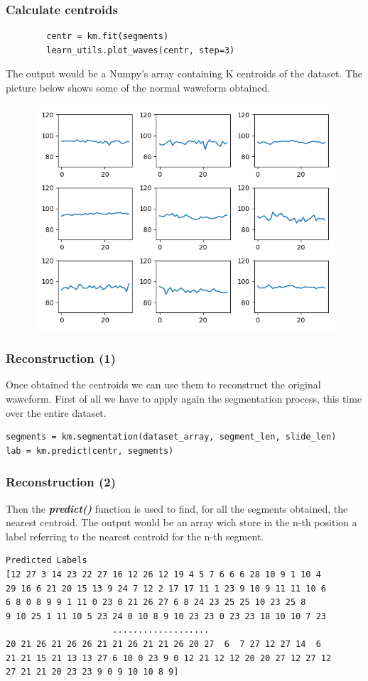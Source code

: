 \documentclass[xcolor ={table,usenames,dvipsnames}]{beamer}
\theoremstyle{definition}
\begin{document}
	\begin{frame}[fragile]
		\frametitle{Calculate centroids}
		\begin{lstlisting}
		centr = km.fit(segments)
		learn_utils.plot_waves(centr, step=3)
		\end{lstlisting}	
		The output would be a Numpy's array containing K centroids of the dataset. The picture below shows some of the normal waweform obtained.
		
		\begin{figure}[h!]
			\centering
			\includegraphics[scale=0.35]{img/centroids.png}
		\end{figure}
	\end{frame}

	
	\begin{frame}[fragile]
		\frametitle{Reconstruction (1)}
		Once obtained the centroids we can use them to reconstruct the original waweform. First of all we have to apply again the segmentation process, this time over the entire dataset. 
		
				
		\begin{lstlisting}
segments = km.segmentation(dataset_array, segment_len, slide_len)
lab = km.predict(centr, segments)
		\end{lstlisting}  
	\end{frame}

	\begin{frame}[fragile]
		\frametitle{Reconstruction (2)}
		Then the \textbf{\textit{predict()}} function is used to find, for all the segments obtained, the nearest centroid. The output would be an array wich store in the n-th position a label referring to the nearest centroid for the n-th segment.
		
			\begin{lstlisting}
Predicted Labels
[12 27 3 14 23 22 27 16 12 26 12 19 4 5 7 6 6 6 28 10 9 1 10 4
29 16 6 21 20 15 13 9 24 7 12 2 17 17 11 1 23 9 10 9 11 11 10 6
6 8 0 8 9 9 1 11 0 23 0 21 26 27 6 8 24 23 25 25 10 23 25 8
9 10 25 1 11 10 5 23 24 0 10 8 9 10 23 23 0 23 23 18 10 10 7 23
                     ................... 
20 21 26 21 26 26 21 21 26 21 21 26 20 27  6  7 27 12 27 14  6 
21 21 15 21 13 13 27 6 10 0 23 9 0 12 21 12 12 20 20 27 12 27 12 
27 21 21 20 23 23 9 0 9 10 10 8 9]
		\end{lstlisting}
	\end{frame}
\end{document}
